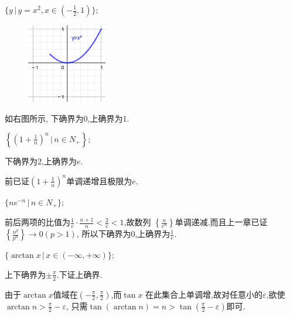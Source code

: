 \documentclass[windows,list,answers]{BHCexam}
\begin{document}
\begin{questions}
\begin{subquestions}
        \subquestion
        $\{y\,\lvert\, y=x^2,x\in(-\frac{1}{2},1)\};$
        \begin{solution}{1cm}
            \methodonly
            \begin{minipage}{\linewidth}
                \begin{figure}
                    \vspace{-2.5cm}
                    \includegraphics[width=3.5cm]{图一.png}
                    \caption{}
                \end{figure}
                如右图所示,
                下确界为0,上确界为1.
            \end{minipage}

        \end{solution}

        \subquestion
        $\left\{\left(1+\frac{1}{n}\right)^n \,\bigg\lvert\, n\in N_+\right\};$
        \begin{solution}{1cm}
            \methodonly
            下确界为2,上确界为$e$.

            前已证$\left(1+\frac{1}{n}\right)^n$单调递增且极限为$e$.
        \end{solution}

        \subquestion
        $\{ne^{-n}\,\lvert\, n\in N_+\};$
        \begin{solution}{1cm}
            \methodonly
            前后两项的比值为$\frac{1}{e}\cdot\frac{n+1}{n}<\frac{2}{e}<1$,故数列
            $\left\{\frac{n}{e^n}\right\}$单调递减.而且上一章已证$\left\{\frac{n^q}{p^n}\right\}\to 0(p>1)$,
            所以下确界为0,上确界为$\frac{1}{e}$.
        \end{solution}

        \subquestion
        $\{\arctan x \,\lvert\, x\in (-\infty,+\infty)\};$
        \begin{solution}{1cm}
            \methodonly
            上下确界为$\pm \frac{\pi}{2}$.下证上确界.

            由于$\arctan x$值域在$\left(-\frac{\pi}{2},\frac{\pi}{2}\right)$,而$\tan x$
            在此集合上单调增,故对任意小的$\varepsilon$,欲使$\arctan n>\frac{\pi}{2}-\varepsilon$,
            只需$\tan(\arctan n)=n>\tan\left(\frac{\pi}{2}-\varepsilon\right)$即可.


\end{solution}
\end{subquestions}
\end{questions}
\end{document}
